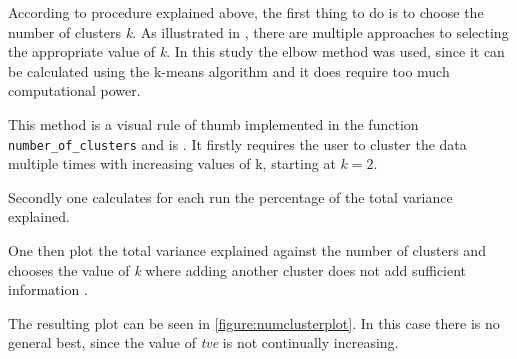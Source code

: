 According to procedure explained above, the first thing to do is to choose the number of clusters \textit{k}. As illustrated in \cite{kodinariya2013review}, there are multiple approaches to selecting the appropriate value of \textit{k}. In this study the elbow method was used, since it can be calculated using the k-means algorithm and it does require too much computational power.

This method is a visual rule of thumb implemented in the function \texttt{number\_of\_clusters} and is \cite{madhulatha2012overview}. It firstly requires the user to cluster the data multiple times with increasing values of k, starting at $k = 2$.



Secondly one calculates for each run the percentage of the total variance explained. 



One then plot the total variance explained against the number of clusters and chooses the value of \textit{k} where adding another cluster does not add sufficient information \citep{madhulatha2012overview}.



The resulting plot can be seen in \ref{figure:numclusterplot}. In this case there is no general best, since the value of \textit{tve} is not continually increasing.

